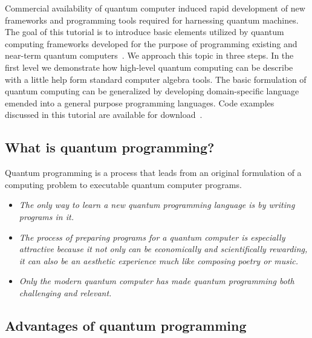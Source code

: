 \documentclass[a4paper,11pt]{article}
\newcommand{\docName}{tutorial\xspace}
\begin{document}
Commercial availability of quantum computer induced rapid development of new 
frameworks and programming tools required for harnessing quantum machines. 
The goal of this \docName is to introduce basic elements utilized by quantum 
computing frameworks developed for the purpose of programming existing and 
near-term quantum  computers~\cite{preskill2018quantum,ibm-qiskit-aqua}. We 
approach this topic in three steps. In the first level we demonstrate how 
high-level quantum computing can be describe with a little help form standard 
computer algebra tools. The basic formulation of quantum computing can be 
generalized by developing domain-specific language emended into a general 
purpose programming languages. Code examples discussed in this \docName are 
available for download~\cite{qprog-tutor}.

\subsection{What is quantum programming?}
Quantum programming is a process that leads from an original formulation of a 
computing problem to executable quantum computer programs.

\begin{itemize}

\item \emph{The only way to learn a new quantum programming language is 
    by writing programs in it.}

\item \emph{The process of preparing programs for a quantum computer is 
    especially attractive because it not only can be economically and 
    scientifically rewarding, it can also be an aesthetic experience much like 
    composing poetry or music.}

\item \emph{Only the modern quantum computer has made quantum 
    programming both challenging and relevant.}

\end{itemize}

\subsection{Advantages of quantum programming}
\end{document}
